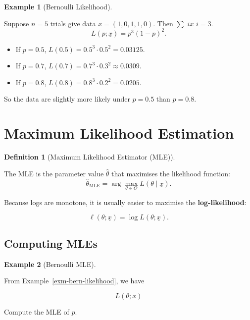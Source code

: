 \documentclass[
  letterpaper,
  DIV=11,
  numbers=noendperiod]{scrreprt}
\providecommand{\tightlist}{%
  \setlength{\itemsep}{0pt}\setlength{\parskip}{0pt}}
\theoremstyle{definition}
\newtheorem{example}{Example}[chapter]
\theoremstyle{plain}
\theoremstyle{definition}
\newtheorem{definition}{Definition}[chapter]
\theoremstyle{remark}
\begin{document}
\begin{example}[Bernoulli
Likelihood]\protect\hypertarget{exm-bern-likelihood-data}{}\label{exm-bern-likelihood-data}

Suppose \(n=5\) trials give data \(\underline{x} = (1,0,1,1,0)\). Then
\(\sum\_i x\_i = 3\). \[
L(p ; \underline{x}) = p^3 (1-p)^2.
\]

\begin{itemize}
\tightlist
\item
  If \(p=0.5\), \(L(0.5) = 0.5^3 \cdot 0.5^2 = 0.03125\).
\item
  If \(p=0.7\), \(L(0.7) = 0.7^3 \cdot 0.3^2 \approx 0.0309\).
\item
  If \(p=0.8\), \(L(0.8) = 0.8^3 \cdot 0.2^2 = 0.0205\).
\end{itemize}

So the data are slightly more likely under \(p=0.5\) than \(p=0.8\).

\end{example}

\section{Maximum Likelihood
Estimation}\label{maximum-likelihood-estimation}

\begin{definition}[Maximum Likelihood Estimator
(MLE)]\protect\hypertarget{def-mle}{}\label{def-mle}

The MLE is the parameter value \(\hat{\theta}\) that maximises the
likelihood function: \[
  \hat{\theta}_{\text{MLE}} = \arg \max_{\theta \in \Theta} L(\theta \mid \underline{x}).
  \]

\end{definition}

Because logs are monotone, it is usually easier to maximise the
\textbf{log-likelihood}:

\[
\ell(\theta ; \underline{x}) = \log L(\theta ; \underline{x}).
\]

\subsection{Computing MLEs}\label{computing-mles}

\begin{example}[Bernoulli
MLE]\protect\hypertarget{exm-bern-mle}{}\label{exm-bern-mle}

From Example~\ref{exm-bern-likelihood}, we have

\[ 
 L(\theta ; x)
\]

Compute the MLE of \(p\).

\end{example}
\end{document}
